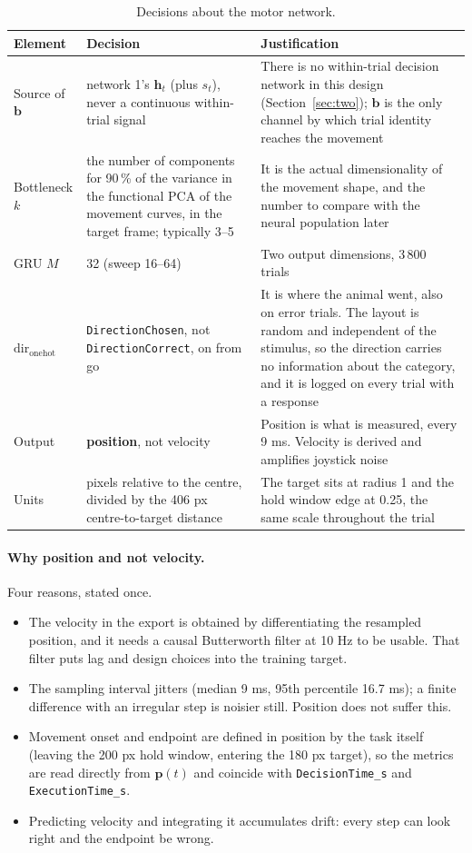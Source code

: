 \documentclass[11pt,a4paper]{article}
\newcommand{\vect}[1]{\bm{#1}}
\begin{document}
\begin{table}[H]
  \centering\small
  \caption{Decisions about the motor network.}
  \begin{tabular}{lp{5cm}p{7.5cm}}
    \toprule
    Element & Decision & Justification \\
    \midrule
    Source of $\vect{b}$ & network 1's $\vect{h}_t$ (plus $s_t$), never a continuous within-trial signal & There is no within-trial decision network in this design (Section~\ref{sec:two}); $\vect{b}$ is the only channel by which trial identity reaches the movement \\
    Bottleneck $k$ & the number of components for 90\,\% of the variance in the functional PCA of the movement curves, in the target frame; typically 3--5 & It is the actual dimensionality of the movement shape, and the number to compare with the neural population later \\
    GRU $M$ & 32 (sweep 16--64) & Two output dimensions, 3\,800 trials \\
    $\mathrm{dir}_{\mathrm{onehot}}$ & \texttt{DirectionChosen}, not \texttt{DirectionCorrect}, on from go & It is where the animal went, also on error trials. The layout is random and independent of the stimulus, so the direction carries no information about the category, and it is logged on every trial with a response \\
    Output & \textbf{position}, not velocity & Position is what is measured, every 9 ms. Velocity is derived and amplifies joystick noise \\
    Units & pixels relative to the centre, divided by the 406 px centre-to-target distance & The target sits at radius 1 and the hold window edge at 0.25, the same scale throughout the trial \\
    \bottomrule
  \end{tabular}
\end{table}

\paragraph{Why position and not velocity.} Four reasons, stated once.
\begin{itemize}[leftmargin=*]
\item The velocity in the export is obtained by differentiating the resampled position,
      and it needs a causal Butterworth filter at 10 Hz to be usable. That filter puts
      lag and design choices into the training target.
\item The sampling interval jitters (median 9 ms, 95th percentile 16.7 ms); a finite
      difference with an irregular step is noisier still. Position does not suffer this.
\item Movement onset and endpoint are defined in position by the task itself (leaving
      the 200 px hold window, entering the 180 px target), so the metrics are read
      directly from $\vect{p}(t)$ and coincide with \texttt{DecisionTime\_s} and
      \texttt{ExecutionTime\_s}.
\item Predicting velocity and integrating it accumulates drift: every step can look
      right and the endpoint be wrong.
\end{itemize}
\end{document}
